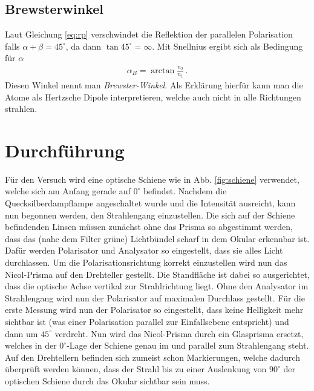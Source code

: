 \documentclass[12pt,a4paper,titlepage,headinclude,bibtotoc]{scrartcl}
\begin{document}
\subsection{Brewsterwinkel}
Laut Gleichung \eqref{eq:rp} verschwindet die Reflektion der parallelen Polarisation falls $\alpha+\beta=45^\circ$, da dann $\tan 45^\circ = \infty$.
Mit Snellnius ergibt sich als Bedingung für $\alpha$
\begin{align}
	\alpha_B=\arctan\frac{n_2}{n_1}\, .
\end{align}
Diesen Winkel nennt man \textit{Brewster-Winkel}.
Als Erklärung hierfür kann man die Atome als Hertzsche Dipole interpretieren, welche auch nicht in alle Richtungen strahlen.



\section{Durchführung}
\label{sec:durchfuehrung}
Für den Versuch wird eine optische Schiene wie in Abb. \ref{fig:schiene} verwendet, welche sich am Anfang gerade auf $0^\circ $  befindet.
Nachdem die Quecksilberdampflampe angeschaltet wurde und die Intensität ausreicht, kann nun begonnen werden, den Strahlengang einzustellen.
Die sich auf der Schiene befindenden Linsen müssen zunächst ohne das Prisma so abgestimmt werden, dass das (nahc dem Filter grüne) Lichtbündel scharf in dem Okular erkennbar ist.
Dafür werden Polarisator und Analysator so eingestellt, dass sie alles Licht durchlassen.
Um die Polarisationsrichtung korrekt einzustellen wird nun das Nicol-Prisma auf den Drehteller gestellt.
Die Standfläche ist dabei so ausgerichtet, dass die optische Achse vertikal zur Strahlrichtung liegt.
Ohne den Analysator im Strahlengang wird nun der Polarisator auf maximalen Durchlass gestellt.
Für die erste Messung wird nun der Polarisator so eingestellt, dass keine Helligkeit mehr sichtbar ist (was einer Polarisation parallel zur Einfallsebene entspricht) und dann um $45^\circ$ verdreht.
Nun wird das Nicol-Prisma durch ein Glasprisma ersetzt, welches in der $0^\circ$-Lage der Schiene genau im und parallel zum Strahlengang steht.
Auf den Drehtellern befinden sich zumeist schon Markierungen, welche  dadurch überprüft werden können, dass der Strahl bis zu einer Auslenkung von $90^\circ$ der optischen Schiene durch das Okular sichtbar sein muss.
\end{document}
